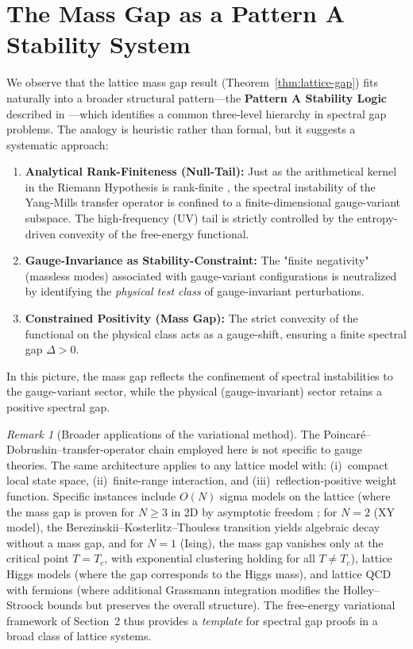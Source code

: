 \documentclass[12pt,a4paper]{article}
\theoremstyle{definition}
\theoremstyle{plain}
\theoremstyle{remark}
\newtheorem{remark}[definition]{Remark}
\begin{document}
\section{The Mass Gap as a Pattern A Stability System}

We observe that the lattice mass gap result (Theorem~\ref{thm:lattice-gap}) fits naturally into a broader structural pattern---the \textbf{Pattern A Stability Logic} described in \cite{FST-Unified2026}---which identifies a common three-level hierarchy in spectral gap problems. The analogy is heuristic rather than formal, but it suggests a systematic approach:

\begin{enumerate}[label=\alph*)]
    \item \textbf{Analytical Rank-Finiteness (Null-Tail):} Just as the arithmetical kernel in the Riemann Hypothesis is rank-finite \cite{GeigerRH2026c}, the spectral instability of the Yang-Mills transfer operator is confined to a finite-dimensional gauge-variant subspace. The high-frequency (UV) tail is strictly controlled by the entropy-driven convexity of the free-energy functional.
    \item \textbf{Gauge-Invariance as Stability-Constraint:} The "finite negativity" (massless modes) associated with gauge-variant configurations is neutralized by identifying the \emph{physical test class} of gauge-invariant perturbations.
    \item \textbf{Constrained Positivity (Mass Gap):} The strict convexity of the functional on the physical class acts as a gauge-shift, ensuring a finite spectral gap $\Delta > 0$. 
\end{enumerate}

In this picture, the mass gap reflects the confinement of spectral instabilities to the gauge-variant sector, while the physical (gauge-invariant) sector retains a positive spectral gap.

\begin{remark}[Broader applications of the variational method]
The Poincar\'e--Dobrushin--transfer-operator chain employed here is not specific to gauge theories. The same architecture applies to any lattice model with: (i)~compact local state space, (ii)~finite-range interaction, and (iii)~reflection-positive weight function. Specific instances include $O(N)$ sigma models on the lattice (where the mass gap is proven for $N \geq 3$ in 2D by asymptotic freedom \cite{Polyakov1975}; for $N = 2$ (XY model), the Berezinskii--Kosterlitz--Thouless transition yields algebraic decay without a mass gap, and for $N = 1$ (Ising), the mass gap vanishes only at the critical point $T = T_c$, with exponential clustering holding for all $T \neq T_c$), lattice Higgs models (where the gap corresponds to the Higgs mass), and lattice QCD with fermions (where additional Grassmann integration modifies the Holley--Stroock bounds but preserves the overall structure). The free-energy variational framework of Section~2 thus provides a \emph{template} for spectral gap proofs in a broad class of lattice systems.
\end{remark}
\end{document}
